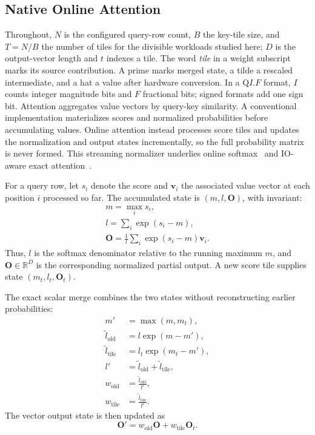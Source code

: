 \documentclass[journal]{IEEEtran}
\begin{document}
\subsection{Native Online Attention}
Throughout, $N$ is the configured query-row count, $B$ the key-tile size, and
$T=N/B$ the number of tiles for the divisible workloads studied here; $D$ is
the output-vector length and $t$ indexes a tile. The word \emph{tile} in a
weight subscript marks its source contribution. A prime marks merged state, a
tilde a rescaled intermediate, and a hat a value after hardware conversion. In
a $\mathrm{Q}I.F$ format, $I$ counts integer magnitude bits and $F$ fractional
bits; signed formats add one sign bit.
Attention aggregates value vectors by query-key similarity. A conventional
implementation materializes scores and normalized probabilities before
accumulating values. Online attention instead processes score tiles and updates
the normalization and output states incrementally, so the full probability
matrix is never formed. This streaming normalizer underlies online
softmax~\cite{milakov2018online} and IO-aware exact
attention~\cite{dao2022flashattention}.

For a query row, let $s_i$ denote the score and $\mathbf{v}_i$ the associated
value vector at each position $i$ processed so far. The accumulated state is
$(m,l,\mathbf{O})$, with invariant:
\[
\begin{gathered}
m=\max_i s_i,\\
l=\sum_i \exp(s_i-m),\\
\mathbf{O}=\frac{1}{l}\sum_i \exp(s_i-m)\mathbf{v}_i.
\end{gathered}
\]
Thus, $l$ is the softmax denominator relative to the running maximum $m$, and
$\mathbf{O}\in\mathbb{R}^{D}$ is the corresponding normalized partial output.
A new score tile supplies state $(m_t,l_t,\mathbf{O}_t)$.

The exact scalar merge combines the two states without reconstructing earlier
probabilities:
\begin{equation}
\label{eq:scalar_merge_recurrence}
\begin{aligned}
m' &= \max(m,m_t),\\
\tilde{l}_{\mathrm{old}} &= l\exp(m-m'),\\
\tilde{l}_{\mathrm{tile}} &= l_t\exp(m_t-m'),\\
l' &= \tilde{l}_{\mathrm{old}}+\tilde{l}_{\mathrm{tile}},\\
w_{\mathrm{old}} &= \frac{\tilde{l}_{\mathrm{old}}}{l'},\\
w_{\mathrm{tile}} &= \frac{\tilde{l}_{\mathrm{tile}}}{l'}.
\end{aligned}
\end{equation}
The vector output state is then updated as
\[
\mathbf{O}'=w_{\mathrm{old}}\mathbf{O}
  +w_{\mathrm{tile}}\mathbf{O}_t.
\]
\end{document}
